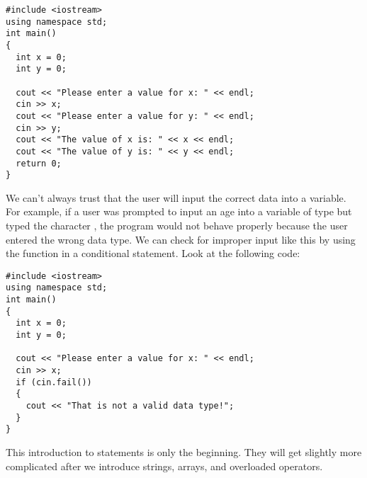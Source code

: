\noindent\begin{minipage}{\linewidth}\begin{lstlisting}
#include <iostream>
using namespace std;
int main()
{
  int x = 0;
  int y = 0;
	
  cout << "Please enter a value for x: " << endl;
  cin >> x;
  cout << "Please enter a value for y: " << endl;
  cin >> y;
  cout << "The value of x is: " << x << endl;
  cout << "The value of y is: " << y << endl;
  return 0;
}
\end{lstlisting}\end{minipage}

We can't always trust that the user will input the correct data into a variable. 
For example, if a user was prompted to input an age into a variable of type  but typed the character , the program would not behave properly because the user entered the wrong data type. 
We can check for improper input like this by using the  function in a conditional statement.
Look at the following code:

\noindent\begin{minipage}{\linewidth}\begin{lstlisting}
#include <iostream>
using namespace std;
int main()
{
  int x = 0;
  int y = 0;
	
  cout << "Please enter a value for x: " << endl;
  cin >> x;
  if (cin.fail())
  {
    cout << "That is not a valid data type!";
  }
}
\end{lstlisting}\end{minipage}

This introduction to  statements is only the beginning. 
They will get slightly more complicated after we introduce strings, arrays, and overloaded operators.

